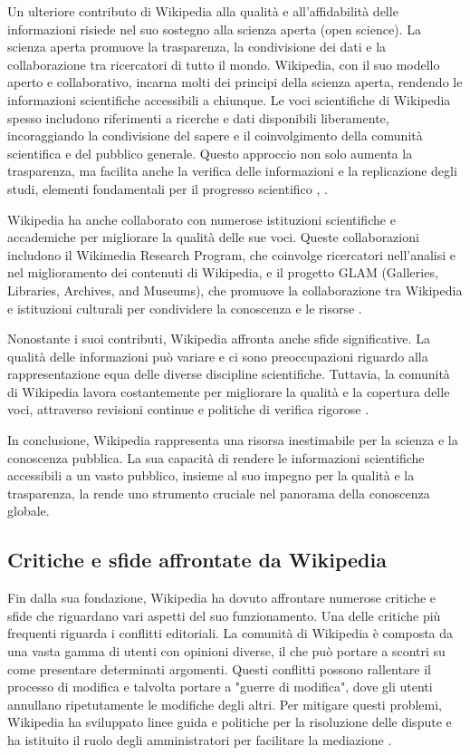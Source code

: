 \documentclass[12pt,a4paper]{report}
\begin{document}
Un ulteriore contributo di Wikipedia alla qualità e all'affidabilità delle informazioni risiede nel suo sostegno alla scienza aperta (open science). La scienza aperta promuove la trasparenza, la condivisione dei dati e la collaborazione tra ricercatori di tutto il mondo. Wikipedia, con il suo modello aperto e collaborativo, incarna molti dei principi della scienza aperta, rendendo le informazioni scientifiche accessibili a chiunque. Le voci scientifiche di Wikipedia spesso includono riferimenti a ricerche e dati disponibili liberamente, incoraggiando la condivisione del sapere e il coinvolgimento della comunità scientifica e del pubblico generale. Questo approccio non solo aumenta la trasparenza, ma facilita anche la verifica delle informazioni e la replicazione degli studi, elementi fondamentali per il progresso scientifico \cite{fecher2014open}, \cite{nielsen2012reinventing}.

Wikipedia ha anche collaborato con numerose istituzioni scientifiche e accademiche per migliorare la qualità delle sue voci. Queste collaborazioni includono il Wikimedia Research Program, che coinvolge ricercatori nell'analisi e nel miglioramento dei contenuti di Wikipedia, e il progetto GLAM (Galleries, Libraries, Archives, and Museums), che promuove la collaborazione tra Wikipedia e istituzioni culturali per condividere la conoscenza e le risorse \cite{jemielniak2014wikipedia}.

Nonostante i suoi contributi, Wikipedia affronta anche sfide significative. La qualità delle informazioni può variare e ci sono preoccupazioni riguardo alla rappresentazione equa delle diverse discipline scientifiche. Tuttavia, la comunità di Wikipedia lavora costantemente per migliorare la qualità e la copertura delle voci, attraverso revisioni continue e politiche di verifica rigorose \cite{denning2005wikipedia}.

In conclusione, Wikipedia rappresenta una risorsa inestimabile per la scienza e la conoscenza pubblica. La sua capacità di rendere le informazioni scientifiche accessibili a un vasto pubblico, insieme al suo impegno per la qualità e la trasparenza, la rende uno strumento cruciale nel panorama della conoscenza globale.

\subsection{Critiche e sfide affrontate da Wikipedia}

Fin dalla sua fondazione, Wikipedia ha dovuto affrontare numerose critiche e sfide che riguardano vari aspetti del suo funzionamento. Una delle critiche più frequenti riguarda i conflitti editoriali. La comunità di Wikipedia è composta da una vasta gamma di utenti con opinioni diverse, il che può portare a scontri su come presentare determinati argomenti. Questi conflitti possono rallentare il processo di modifica e talvolta portare a "guerre di modifica", dove gli utenti annullano ripetutamente le modifiche degli altri. Per mitigare questi problemi, Wikipedia ha sviluppato linee guida e politiche per la risoluzione delle dispute e ha istituito il ruolo degli amministratori per facilitare la mediazione \cite{reagle2010good}.
\end{document}
